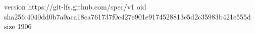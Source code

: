 version https://git-lfs.github.com/spec/v1
oid sha256:4040dd0b7a9aca18ca761737f0c427e901e9174528813e5d2c35983b421e555d
size 1906
